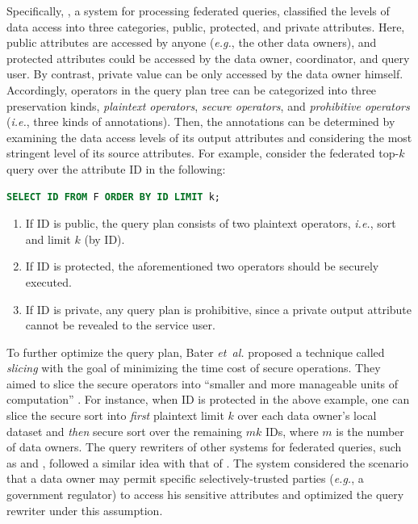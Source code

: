 \documentclass[11pt]{article}
\newcommand{\etal}{\textit{et~al.}\xspace}
\newcommand{\eg}{\textit{e.g.},\xspace}
\newcommand{\ie}{\textit{i.e.},\xspace}
\begin{document}
Specifically, \SMCQL \cite{ref_bater2017smcql}, a system for processing federated queries, classified the levels of data access into three categories, public, protected, and private attributes.
Here, public attributes are accessed by anyone (\eg the other data owners), and protected attributes could be accessed by the data owner, coordinator, and query user.
By contrast, private value can be only accessed by the data owner himself.
Accordingly, operators in the query plan tree can be categorized into three preservation kinds, \textit{plaintext operators}, \textit{secure operators}, and \textit{prohibitive operators} (\ie three kinds of annotations).
Then, the annotations can be determined by examining the data access levels of its output attributes and considering the most stringent level of its source attributes.
For example, consider the federated top-$k$ query over the attribute ID in the following:
\begin{lstlisting}[language=SQL]
  SELECT ID FROM F ORDER BY ID LIMIT k;
\end{lstlisting}
\begin{enumerate}[\quad(1)]
	\item If ID is public, the query plan consists of two plaintext operators, \ie sort and limit $k$ (by ID).
	\item If ID is protected, the aforementioned two operators should be securely executed.
	\item If ID is private, any query plan is prohibitive, since a private output attribute cannot be revealed to the service user.
\end{enumerate}

To further optimize the query plan, Bater \etal \cite{ref_bater2017smcql} proposed a technique called \textit{slicing} with the goal of minimizing the time cost of secure operations.
They aimed to slice the secure operators into ``smaller and more manageable units of computation'' \cite{ref_bater2017smcql}.
For instance, when ID is protected in the above example, one can slice the secure sort into \textit{first} plaintext limit $k$ over each data owner's local dataset and \textit{then} secure sort over the remaining $mk$ IDs,
where $m$ is the number of data owners.
The query rewriters of other systems for federated queries, such as \Shrinkwrap \cite{ref_bater2018shrinkwrap} and \SAQE \cite{ref_bater2020saqe}, followed a similar idea with that of \SMCQL.
The system \Conclave \cite{ref_volgushev2019conclave} considered the scenario that a data owner may permit specific selectively-trusted parties (\eg a government regulator) to access his sensitive attributes and optimized the query rewriter under this assumption.
\end{document}
